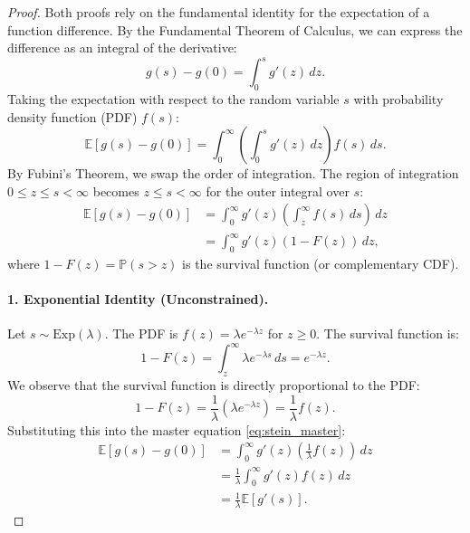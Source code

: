 \documentclass{article}
\theoremstyle{plain}
\theoremstyle{definition}
\theoremstyle{remark}
\begin{document}
\begin{proof}
Both proofs rely on the fundamental identity for the expectation of a function difference. By the Fundamental Theorem of Calculus, we can express the difference as an integral of the derivative:
$$ g(s) - g(0) = \int_0^s g'(z) \, dz. $$
Taking the expectation with respect to the random variable $s$ with probability density function (PDF) $f(s)$:
\begin{equation}
    \mathbb{E}[g(s) - g(0)] = \int_{0}^{\infty} \left( \int_0^s g'(z) \, dz \right) f(s) \, ds.
\end{equation}
By Fubini's Theorem, we swap the order of integration. The region of integration $0 \le z \le s < \infty$ becomes $z \le s < \infty$ for the outer integral over $s$:
\begin{align}
    \mathbb{E}[g(s) - g(0)] &= \int_{0}^{\infty} g'(z) \left( \int_z^{\infty} f(s) \, ds \right) \, dz \nonumber \\
    &= \int_{0}^{\infty} g'(z) (1 - F(z)) \, dz, \label{eq:stein_master}
\end{align}
where $1 - F(z) = \mathbb{P}(s > z)$ is the survival function (or complementary CDF).

\paragraph{1. Exponential Identity (Unconstrained).}
Let $s \sim \mathrm{Exp}(\lambda)$. The PDF is $f(z) = \lambda e^{-\lambda z}$ for $z \ge 0$.
The survival function is:
$$ 1 - F(z) = \int_z^\infty \lambda e^{-\lambda s} \, ds = e^{-\lambda z}. $$
We observe that the survival function is directly proportional to the PDF:
$$ 1 - F(z) = \frac{1}{\lambda} (\lambda e^{-\lambda z}) = \frac{1}{\lambda} f(z). $$
Substituting this into the master equation \eqref{eq:stein_master}:
\begin{align*}
    \mathbb{E}[g(s) - g(0)] &= \int_{0}^{\infty} g'(z) \left( \frac{1}{\lambda} f(z) \right) \, dz \\
    &= \frac{1}{\lambda} \int_{0}^{\infty} g'(z) f(z) \, dz \\
    &= \frac{1}{\lambda} \mathbb{E}[g'(s)].
\end{align*}


\end{proof}
\end{document}
